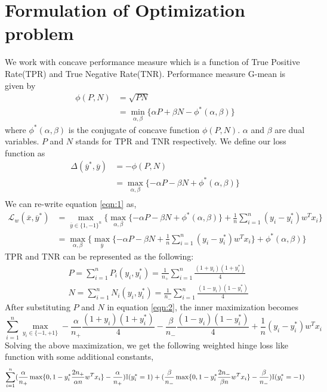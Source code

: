 \documentclass{article} %
\begin{document}
\section{Formulation of Optimization problem}
We work with concave performance measure which is a function of True Positive Rate(TPR) and True Negative Rate(TNR). Performance measure G-mean is given by
\begin{equation*}
\begin{split}
	\phi(P,N) &=\sqrt{PN}\\
	& = \min_{\alpha,\beta}\{\alpha P+\beta N - \phi^*(\alpha,\beta)\}
\end{split}
\end{equation*}
where $\phi^*(\alpha,\beta)$ is the conjugate of concave function $\phi(P,N)$. $\alpha$ and $\beta$ are dual variables. $P$ and $N$ stands for TPR and TNR respectively. We define our loss function as
\begin{equation*}
\begin{split}
	\Delta(\overline{y}^*,\overline{y}) &= -\phi(P,N) \\
	&= \max_{\alpha,\beta}\{-\alpha P-\beta N + \phi^*(\alpha,\beta)\}\\
\end{split}
\end{equation*}
We can re-write equation \ref{eqn:1} as,
\begin{align}
\label{eqn:2}
	\mathcal L_w(\overline{x},\overline{y}^*)\nonumber &=\max_{\overline{y}\in\{1,-1\}^n}\{\max_{\alpha,\beta}\{-\alpha P-\beta N +\phi^*(\alpha,\beta)\} + \frac{1}{n}\sum_{i=1}^n (y_i - y_i^*)w^Tx_i\}\nonumber\\
	&=\max_{\alpha,\beta}\{\max_{\overline{y}}\{-\alpha P-\beta N  + \frac{1}{n}\sum_{i=1}^n (y_i - y_i^*)w^Tx_i\}+\phi^*(\alpha,\beta)\}
\end{align}
TPR and TNR can be represented as the following:
\begin{equation*}
\begin{split}
	&P = \sum_{i=1}^nP_i(y_i,y_i^*)= \frac{1}{n_+}\sum_{i=1}^n\frac{(1+y_i)(1+y_i^*)}{4}\\
	&N = \sum_{i=1}^nN_i(y_i,y_i^*)= \frac{1}{n_-}\sum_{i=1}^n\frac{(1-y_i)(1-y_i^*)}{4}
\end{split}
\end{equation*}
After substituting $P$ and $N$ in equation \ref{eqn:2}, the inner maximization becomes
\begin{equation*}
\sum_{i=1}^n\max_{y_i\in\{-1,+1\}}-\frac{\alpha}{n_+}\frac{(1+y_i)(1+y_i^*)}{4} - \frac{\beta}{n_-}\frac{(1-y_i)(1-y_i^*)}{4} + \frac{1}{n}(y_i - y_i^*)w^Tx_i
\end{equation*}
Solving the above maximization, we get the following weighted hinge loss like function with some additional constants,
\begin{equation*}
\sum_{i=1}^n
(\frac{\alpha}{n_+}\max\{0,1-y_i^*\frac{2n_+}{\alpha n}w^Tx_i\}
- \frac{\alpha}{n_+})\mathbb{I}(y^*_i=1)\\
+ (\frac{\beta}{n_-}\max\{0,1-y_i^*\frac{2n_-}{\beta n}w^Tx_i\}
- \frac{\beta}{n_-})\mathbb{I}(y^*_i=-1)
\end{equation*}
\end{document}
